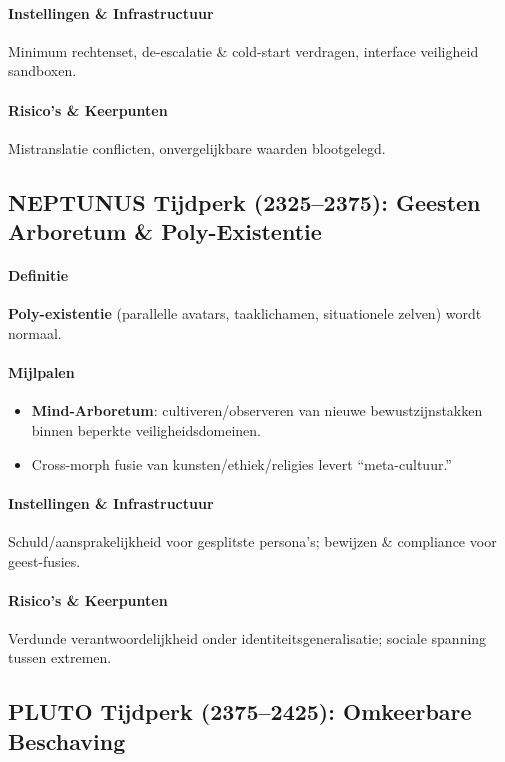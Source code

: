 \documentclass[11pt]{article}
\begin{document}
\paragraph{Instellingen \& Infrastructuur} Minimum rechtenset, de-escalatie \& cold-start verdragen, interface veiligheid sandboxen.

\paragraph{Risico's \& Keerpunten} Mistranslatie conflicten, onvergelijkbare waarden blootgelegd.

\subsection{NEPTUNUS Tijdperk (2325–2375): Geesten Arboretum \& Poly-Existentie}
\paragraph{Definitie} \textbf{Poly-existentie} (parallelle avatars, taaklichamen, situationele zelven) wordt normaal.

\paragraph{Mijlpalen}
\begin{itemize}[noitemsep]
  \item \textbf{Mind-Arboretum}: cultiveren/observeren van nieuwe bewustzijnstakken binnen beperkte veiligheidsdomeinen.
  \item Cross-morph fusie van kunsten/ethiek/religies levert ``meta-cultuur.''
\end{itemize}

\paragraph{Instellingen \& Infrastructuur} Schuld/aansprakelijkheid voor gesplitste persona's; bewijzen \& compliance voor geest-fusies.

\paragraph{Risico's \& Keerpunten} Verdunde verantwoordelijkheid onder identiteitsgeneralisatie; sociale spanning tussen extremen.

\subsection{PLUTO Tijdperk (2375–2425): Omkeerbare Beschaving}
\end{document}

